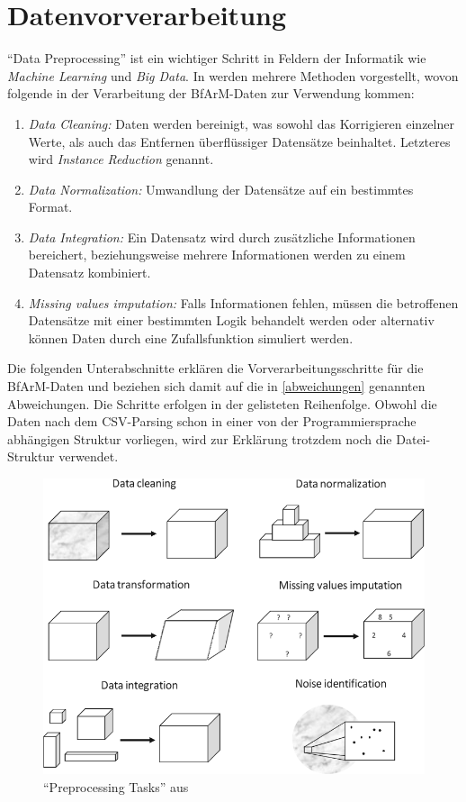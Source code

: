 \section{Datenvorverarbeitung}

``Data Preprocessing'' ist ein wichtiger Schritt in Feldern der Informatik wie \emph{Machine Learning} und \emph{Big Data}. In \citep{garcia2016big} werden mehrere Methoden vorgestellt, wovon folgende in der Verarbeitung der BfArM-Daten zur Verwendung kommen:

\begin{enumerate}
\item \emph{Data Cleaning:} Daten werden bereinigt, was sowohl das Korrigieren einzelner Werte, als auch das Entfernen überflüssiger Datensätze beinhaltet. Letzteres wird \emph{Instance Reduction} genannt. 
\item \emph{Data Normalization:} Umwandlung der Datensätze auf ein bestimmtes Format. 
\item \emph{Data Integration:} Ein Datensatz wird durch zusätzliche Informationen bereichert, beziehungsweise mehrere Informationen werden zu einem Datensatz kombiniert. 
\item \emph{Missing values imputation:} Falls Informationen fehlen, müssen die betroffenen Datensätze mit einer bestimmten Logik behandelt werden oder alternativ können Daten durch eine Zufallsfunktion simuliert werden. 
\end{enumerate}

Die folgenden Unterabschnitte erklären die Vorverarbeitungsschritte für die BfArM-Daten und beziehen sich damit auf die in \ref{abweichungen} genannten Abweichungen. Die Schritte erfolgen in der gelisteten Reihenfolge. Obwohl die Daten nach dem CSV-Parsing schon in einer von der Programmiersprache abhängigen Struktur vorliegen, wird zur Erklärung trotzdem noch die Datei-Struktur verwendet.

\begin{figure}[H]
    \centering
    \includegraphics[width=.8\linewidth]{../img/data-preproc.png}
    \caption{``Preprocessing Tasks'' aus \citep[Seite 4]{garcia2016big}}
\end{figure}

